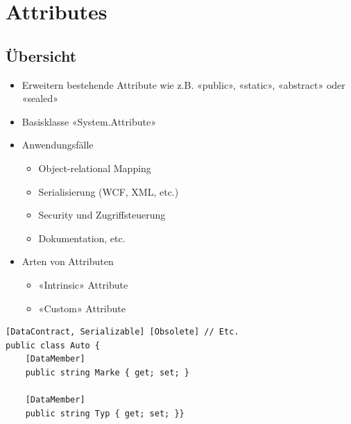 
\section{Attributes}

\subsection{Übersicht}
\begin{itemize}
    \item Erweitern bestehende Attribute wie z.B. «public», «static», «abstract» oder «sealed»
    \item Basisklasse «System.Attribute»
    \item Anwendungsfälle
    \begin{itemize}
        \item Object-relational Mapping
        \item Serialisierung (WCF, XML, etc.)
        \item Security und Zugriffsteuerung
        \item Dokumentation, etc.
    \end{itemize}
    \item Arten von Attributen
    \begin{itemize}
        \item «Intrinsic» Attribute
        \item «Custom» Attribute
    \end{itemize}
\end{itemize}
\begin{lstlisting}
[DataContract, Serializable] [Obsolete] // Etc.
public class Auto {
    [DataMember]
    public string Marke { get; set; }

    [DataMember]
    public string Typ { get; set; }}
\end{lstlisting}

